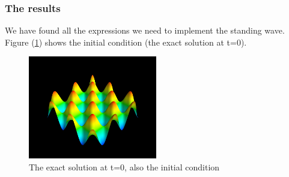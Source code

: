 \subsubsection{The results}
We have found all the expressions we need to implement the standing wave. Figure (\ref{exact_fig}) shows the initial condition (the exact solution at t=0).


\begin{figure}[H]
 \centering
 \includegraphics[width=0.5\textwidth]{u_exact1.png}
 \caption{The exact solution at t=0, also the initial condition}
 \label{exact_fig}
\end{figure}



